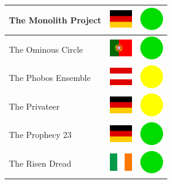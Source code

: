 \documentclass[12pt, a4paper, twoside]{report}
\begin{document}
\begin{center}
\begin{longtable}{|p{5cm}|p{2cm}|p{2cm}|}
The Monolith Project & \includegraphics[width=1cm]{4x3/de} & \includegraphics[width=1cm]{likes/y} \\ \hline
The Ominous Circle & \includegraphics[width=1cm]{4x3/pt} & \includegraphics[width=1cm]{likes/y} \\ \hline
The Phobos Ensemble & \includegraphics[width=1cm]{4x3/at} & \includegraphics[width=1cm]{likes/m} \\ \hline
The Privateer & \includegraphics[width=1cm]{4x3/de} & \includegraphics[width=1cm]{likes/m} \\ \hline
The Prophecy 23 & \includegraphics[width=1cm]{4x3/de} & \includegraphics[width=1cm]{likes/y} \\ \hline
The Risen Dread & \includegraphics[width=1cm]{4x3/ie} & \includegraphics[width=1cm]{likes/y} \\ \hline

\end{longtable}
\end{center}
\end{document}
